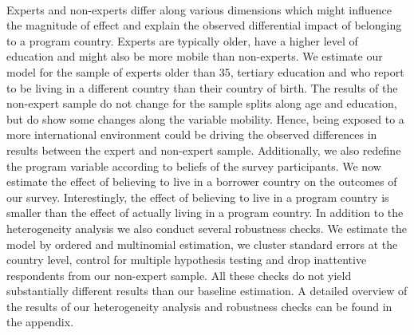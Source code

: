 \\
Experts and non-experts differ along various dimensions which might influence the magnitude of effect and explain the observed differential impact of belonging to a program country. Experts are typically older, have a higher level of education and might also be more mobile than non-experts. We estimate our model for the sample of experts older than 35, tertiary education and who report to be living in a different country than their country of birth. The results of the non-expert sample do not change for the sample splits along age and education, but do show some changes along the variable mobility. Hence, being exposed to a more international environment could be driving the observed differences in results between the expert and non-expert sample. Additionally, we also redefine the program variable according to beliefs of the survey participants. We now estimate the effect of believing to live in a borrower country on the outcomes of our survey. Interestingly, the effect of believing to live in a program country is smaller than the effect of actually living in a program country. In addition to the heterogeneity analysis we also conduct several robustness checks. We estimate the model by ordered and multinomial estimation, we cluster standard errors at the country level, control for multiple hypothesis testing and drop inattentive respondents from our non-expert sample. All these checks do not yield substantially different results than our baseline estimation. A detailed overview of the results of our heterogeneity analysis and robustness checks can be found in the appendix. 


